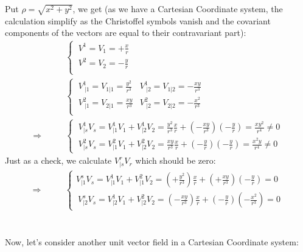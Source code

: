 Put $ \rho = \sqrt{x^2+y^2}$, we get (as we have a Cartesian Coordinate system, the calculation simplify as the Christoffel symbols vanish and the covariant components of the vectors are equal to their contravariant part):
\begin{align}
\ & \left \{ \begin{array}{c}
\ V^1 = V_1 = +\frac{x}{r}\\
\ V^2 = V_2 = -\frac{y}{r}\\
\end{array}\right.\\
\ & \left \{ \begin{array}{cc}
\ V^1_{\ |1} =  V_{1|1} = \frac{y^2}{r^3}&V^1_{\ |2} =  V_{1|2} = -\frac{xy}{r^3}\\
\ V^2_{\ |1} =  V_{2|1} = \frac{xy}{r^3}&V^2_{\ |2} =  V_{2|2} = -\frac{x^2}{r^3}\\
\end{array}\right.\\
\Rightarrow \quad\quad &\left \{ \begin{array}{c} \  V^1_{|s}V_s = V^1_{|1}V_1+V^1_{|2}V_2 = \frac{y^2}{r^3}\frac{x}{r}+ (-\frac{xy}{r^3})(-\frac{y}{r}) = \frac{xy^2}{r^4} \ne 0\\
\ V^2_{|s}V_s = V^2_{|1}V_1+V^2_{|2}V_2 = \frac{xy}{r^3}\frac{x}{r}+ (-\frac{y}{r})(-\frac{y}{r}) = \frac{x^2 y}{r^4} \ne 0
\end{array} \right.
\end{align}
Just as a check, we calculate $V^r_{|s}V_r$ which should be zero:
\begin{align}
\Rightarrow \quad\quad &\left \{ \begin{array}{c}V^s_{|1}V_s = V^1_{|1}V_1+V^2_{|1}V_2 = (+\frac{y^2}{r^3})\frac{x}{r}+ (+\frac{xy}{r^3})(-\frac{y}{r}) =0\\
\ V^s_{|2}V_s = V^1_{|2}V_1+V^2_{|2}V_2 = (-\frac{xy}{r^3})\frac{x}{r}+ (-\frac{y}{r})(-\frac{x^2}{r^3}) = 0
\end{array} \right.
\end{align}\\\\
Now, let's consider another unit vector field in a Cartesian Coordinate system:
